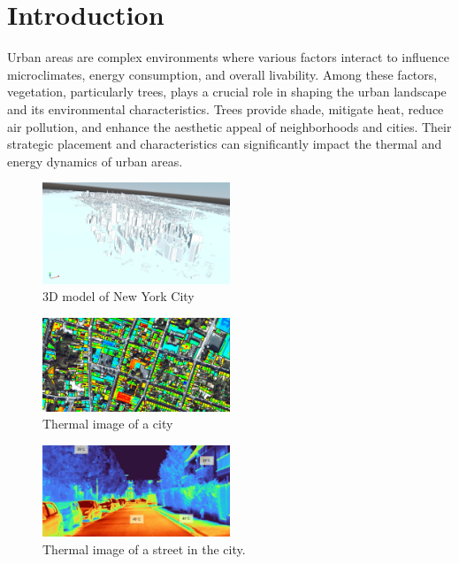 \documentclass[12pt]{article}
\begin{document}
\newpage

\section{Introduction}
Urban areas are complex environments where various factors interact to influence 
microclimates, energy consumption, and overall livability. Among these factors, 
vegetation, particularly trees, plays a crucial role in shaping the urban landscape 
and its environmental characteristics. Trees provide shade, mitigate heat, reduce 
air pollution, and enhance the aesthetic appeal of neighborhoods and cities. Their 
strategic placement and characteristics can significantly impact the thermal and 
energy dynamics of urban areas.

\begin{figure}[H]
    \centering
    \includegraphics[width=0.5\textwidth]{images/NY_mesh.png}
    \caption{3D model of New York City \cite{img:NY}}
\end{figure}

\begin{figure}[H]
    \centering
    \includegraphics[width=0.5\textwidth]{images/thermographie-aerienne.jpg}
    \caption{Thermal image of a city \cite{img:aerialview}}
\end{figure}
\begin{figure}[H]
    \centering
    \includegraphics[width=0.5\textwidth]{images/heat_street.png}
    \caption{Thermal image of a street in the city. \cite{img:street_thermography}}
\end{figure}
\end{document}

